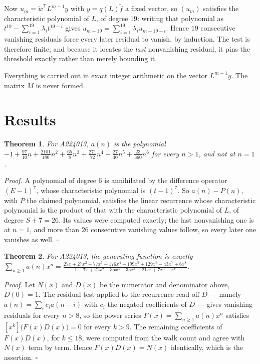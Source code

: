 \documentclass[11pt]{article}
\newtheorem{theorem}{Theorem}
\theoremstyle{definition}
\begin{document}
Now $u_m = \tilde w^{\mathsf T} L^{m-1} y$ with $y = q(L)\tilde f$ a fixed vector, so $(u_m)$ satisfies the characteristic polynomial of $L$, of degree $19$: writing that polynomial as $t^{19} - \sum_{i=1}^{19} \lambda_i t^{19-i}$ gives $u_{m+19} = \sum_{i=1}^{19} \lambda_i u_{m+19-i}$. Hence $19$ consecutive vanishing residuals force every later residual to vanish, by induction. The test is therefore finite; and because it locates the {\itshape last} nonvanishing residual, it pins the threshold exactly rather than merely bounding it.

Everything is carried out in exact integer arithmetic on the vector $L^{m-1}y$. The matrix $M$ is never formed.

\section{Results}

\begin{theorem} For A224013, $a(n)$ is the polynomial $-1 + \frac{97}{10}n + \frac{2101}{180}n^{2} + \frac{65}{8}n^{3} + \frac{271}{72}n^{4} + \frac{27}{40}n^{5} + \frac{23}{360}n^{6}$ for every $n > 1$, and not at $n = 1$.\end{theorem}

{\itshape Proof.} A polynomial of degree $6$ is annihilated by the difference operator $(E-1)^{7}$, whose characteristic polynomial is $(t-1)^{7}$. So $a(n) - P(n)$, with $P$ the claimed polynomial, satisfies the linear recurrence whose characteristic polynomial is the product of that with the characteristic polynomial of $L$, of degree $S + 7 = 26$. Its values were computed exactly; the last nonvanishing one is at $n = 1$, and more than $26$ consecutive vanishing values follow, so every later one vanishes as well. $\square$

\begin{theorem} For A224013, the generating function is exactly $\sum_{n\ge 1} a(n)x^n = \frac{27x + 27x^{2} - 77x^{3} + 176x^{4} - 199x^{5} + 129x^{6} - 43x^{7} + 6x^{8}}{1 - 7x + 21x^{2} - 35x^{3} + 35x^{4} - 21x^{5} + 7x^{6} - x^{7}}$.\end{theorem}

{\itshape Proof.} Let $N(x)$ and $D(x)$ be the numerator and denominator above, $D(0)=1$. The residual test applied to the recurrence read off $D$ --- namely $a(n) = \sum_i c_i a(n-i)$ with $c_i$ the negated coefficients of $D$ --- gives vanishing residuals for every $n > 8$, so the power series $F(x)=\sum_{n\ge 1}a(n)x^n$ satisfies $[x^k]\bigl(F(x)D(x)\bigr) = 0$ for every $k > 9$. The remaining coefficients of $F(x)D(x)$, for $k \le 18$, were computed from the walk count and agree with $N(x)$ term by term. Hence $F(x)D(x) = N(x)$ identically, which is the assertion. $\square$
\end{document}
